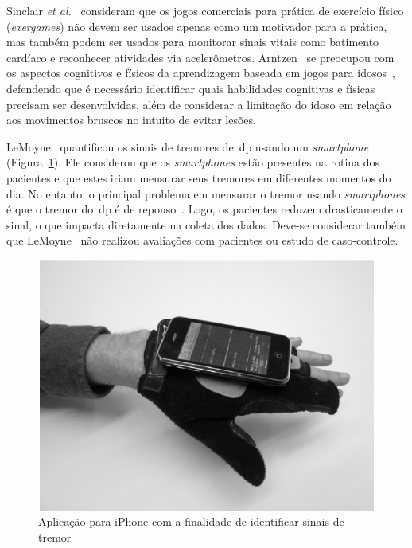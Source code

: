 Sinclair \textit{et al.}~\cite{Sinclair:2009:UVB:1515604.1515617} consideram que os jogos comerciais para prática de exercício físico (\textit{exergames}) não devem ser usados apenas como um motivador para a prática, mas também podem ser usados para monitorar sinais vitais como batimento cardíaco e reconhecer atividades via acelerômetros. Arntzen~\cite{arntzen2011} se preocupou com os aspectos cognitivos e físicos da aprendizagem baseada em jogos para idosos~\cite{arntzen2011}, defendendo que é necessário identificar quais habilidades cognitivas e físicas precisam ser desenvolvidas, além de considerar a limitação do idoso em relação aos movimentos bruscos no intuito de evitar lesões.

LeMoyne~\cite{lemoyne2010} quantificou os sinais de tremores de~\ac{dp} usando um \textit{smartphone} (Figura~\ref{fig:iphone-tremor}). Ele considerou que os \textit{smartphones} estão presentes na rotina dos pacientes e que estes iriam mensurar seus tremores em diferentes momentos do dia. No entanto, o principal problema em mensurar o tremor usando \textit{smartphones} é que o tremor do~\ac{dp} é de repouso~\cite{jankovic2008}. Logo, os pacientes reduzem drasticamente o sinal, o que impacta diretamente na coleta dos dados. Deve-se considerar também que LeMoyne~\cite{lemoyne2010} não realizou avaliações com pacientes ou estudo de caso-controle. 

\begin{figure}
\centering
  \includegraphics[scale=0.3]{./img/moyne-iphone.png}
\caption[Aplicação para \textit{smartphone} com a finalidade de identificar sinais de tremor]{Aplicação para iPhone com a finalidade de identificar sinais de tremor ~\cite{lemoyne2010}}
 \label{fig:iphone-tremor}
\end{figure}



